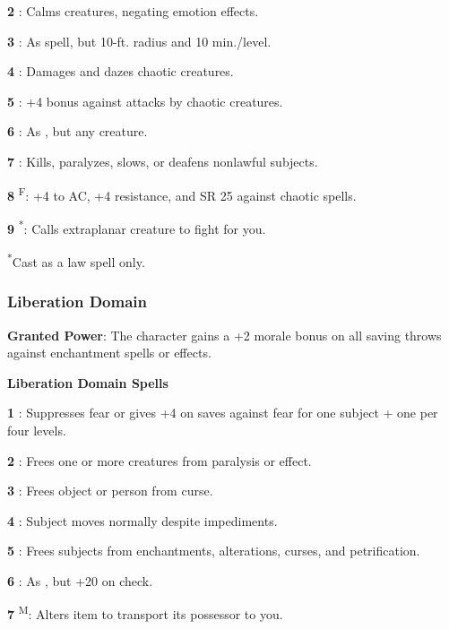 \textbf{2} : Calms creatures, negating emotion effects.

\textbf{3} : As  spell, but 10-ft. radius and 10 min./level.

\textbf{4} : Damages and dazes chaotic creatures.

\textbf{5} : +4 bonus against attacks by chaotic creatures.

\textbf{6} : As , but any creature.

\textbf{7} : Kills, paralyzes, slows, or deafens nonlawful subjects.

\textbf{8} \textsuperscript{F}: +4 to AC, +4 resistance, and SR 25 against chaotic spells.

\textbf{9} \textsuperscript{*}: Calls extraplanar creature to fight for you.

\textsuperscript{*}Cast as a law spell only.

\subsubsection{Liberation Domain}

\textbf{Granted Power}: The character gains a +2 morale bonus on all saving throws against enchantment spells or effects.

\textbf{Liberation Domain Spells}

\textbf{1} : Suppresses fear or gives +4 on saves against fear for one subject + one per four levels.

\textbf{2} :  Frees one or more creatures from paralysis or  effect.

\textbf{3} : Frees object or person from curse.

\textbf{4} : Subject moves normally despite impediments.

\textbf{5} : Frees subjects from enchantments, alterations, curses, and petrification.

\textbf{6} : As , but +20 on check.

\textbf{7} \textsuperscript{M}: Alters item to transport its possessor to you.

